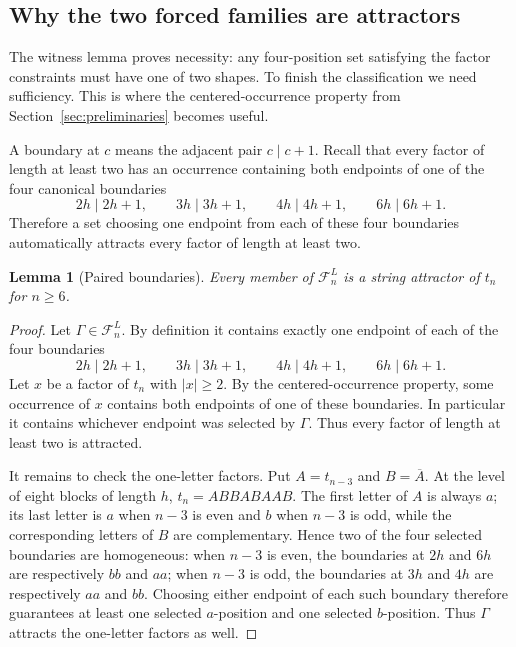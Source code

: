 \documentclass[11pt,a4paper]{article}
\newtheorem{lemma}[theorem]{Lemma}
\theoremstyle{definition}\newtheorem{definition}[theorem]{Definition}
\theoremstyle{remark}\newtheorem{remark}[theorem]{Remark}
\newcommand{\FL}{\mathcal{F}^{L}}
\begin{document}
\subsection{Why the two forced families are attractors}
\label{subsec:sufficiency-stable}

The witness lemma proves necessity: any four-position set satisfying the factor constraints must have one of two shapes.  To finish the classification we need sufficiency.  This is where the centered-occurrence property from Section~\ref{sec:preliminaries} becomes useful.

A boundary at $c$ means the adjacent pair $c\mid c+1$.  Recall that every factor of length at least two has an occurrence containing both endpoints of one of the four canonical boundaries
\[
 2h\mid2h+1,\qquad
 3h\mid3h+1,\qquad
 4h\mid4h+1,\qquad
 6h\mid6h+1.
\]
Therefore a set choosing one endpoint from each of these four boundaries automatically attracts every factor of length at least two.

\begin{lemma}[Paired boundaries]
\label{lem:paired-boundaries}
Every member of $\FL_n$ is a string attractor of $t_n$ for $n\ge6$.
\end{lemma}

\begin{proof}
Let $\Gamma\in\FL_n$.  By definition it contains exactly one endpoint of each of the four boundaries
\[
 2h\mid2h+1,\qquad 3h\mid3h+1,\qquad
 4h\mid4h+1,\qquad 6h\mid6h+1.
\]
Let $x$ be a factor of $t_n$ with $|x|\ge2$.  By the centered-occurrence property, some occurrence of $x$ contains both endpoints of one of these boundaries.  In particular it contains whichever endpoint was selected by $\Gamma$.  Thus every factor of length at least two is attracted.

It remains to check the one-letter factors.  Put $A=t_{n-3}$ and $B=\overline{A}$.  At the level of eight blocks of length $h$,
$
t_n=ABBABAAB.
$
The first letter of $A$ is always $a$; its last letter is $a$ when $n-3$ is even and $b$ when $n-3$ is odd, while the corresponding letters of $B$ are complementary.  Hence two of the four selected boundaries are homogeneous: when $n-3$ is even, the boundaries at $2h$ and $6h$ are respectively $bb$ and $aa$; when $n-3$ is odd, the boundaries at $3h$ and $4h$ are respectively $aa$ and $bb$.  Choosing either endpoint of each such boundary therefore guarantees at least one selected $a$-position and one selected $b$-position.  Thus $\Gamma$ attracts the one-letter factors as well.
\end{proof}
\end{document}
